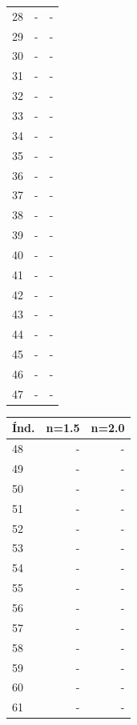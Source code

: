\begin{appendix}
\begin{table}[h!]
\begin{tabular}{|l|r|r|}
28    & -        & -        \\
29    & -        & -        \\
30    & -        & -        \\
31    & -        & -        \\
32    & -        & -        \\
33    & -        & -        \\
34    & -        & -        \\
35    & -        & -        \\
36    & -        & -        \\
37    & -        & -        \\
38    & -        & -        \\
39    & -        & -        \\
40    & -        & -        \\
41    & -        & -        \\
42    & -        & -        \\
43    & -        & -        \\
44    & -        & -        \\
45    & -        & -        \\
46    & -        & -        \\
47    & -        & -        \\\hline
\end{tabular}
\quad
\begin{tabular}{|l|r|r|}
\hline
\textbf{\'Ind.} & \textbf{n=1.5} & \textbf{n=2.0}\\\hline
48    & -        & -        \\
49    & -        & -        \\
50    & -        & -        \\
51    & -        & -        \\
52    & -        & -        \\
53    & -        & -        \\
54    & -        & -        \\
55    & -        & -        \\
56    & -        & -        \\
57    & -        & -        \\
58    & -        & -        \\
59    & -        & -        \\
60    & -        & -        \\
61    & -        & -        \\

\end{tabular}
\end{table}
\end{appendix}
